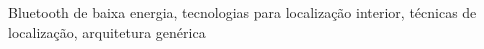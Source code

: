 \begin{palavraschave}
Bluetooth de baixa energia, tecnologias para localização interior, técnicas de localização, arquitetura genérica 
\end{palavraschave}
\clearpage
\thispagestyle{empty}
\cleardoublepage